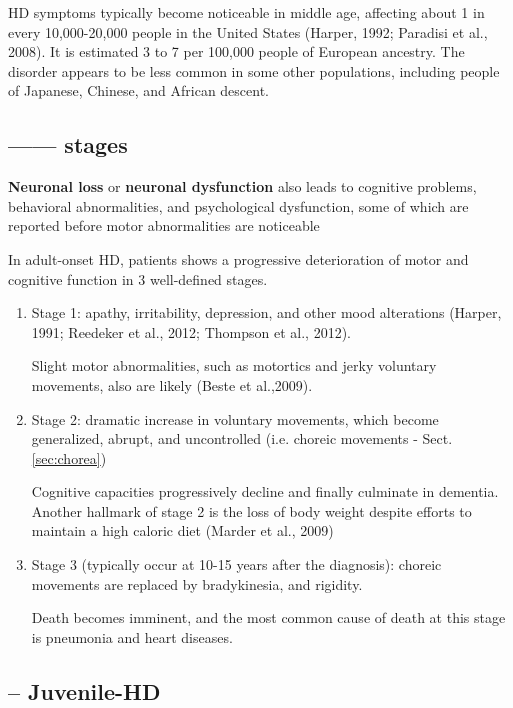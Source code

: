 HD symptoms typically become noticeable in middle age, affecting about 1 in
every 10,000-20,000 people in the United States (Harper, 1992; Paradisi et al.,
2008). It is estimated 3 to 7 per 100,000 people of European ancestry. The
disorder appears to be less common in some other populations, including people
of Japanese, Chinese, and African descent.

\subsection{------ stages}

{\bf Neuronal loss} or {\bf neuronal dysfunction} also leads to cognitive
problems, behavioral abnormalities, and psychological dysfunction, some of which
are reported before motor abnormalities are noticeable

In adult-onset HD, patients shows a progressive deterioration of motor and
cognitive function in 3 well-defined stages.

\begin{enumerate}
  \item Stage 1: apathy, irritability, depression, and other
  mood alterations (Harper, 1991; Reedeker et al., 2012; Thompson et al., 2012).
  
  Slight motor abnormalities, such as motortics and jerky  
  voluntary movements, also are likely (Beste et al.,2009).

  \item Stage 2: dramatic increase in voluntary movements, which become
  generalized, abrupt, and uncontrolled (i.e. choreic movements -
  Sect.\ref{sec:chorea})
  
  Cognitive capacities progressively decline and finally culminate in dementia.
  Another hallmark of stage 2 is the loss of body weight despite efforts to
  maintain a high caloric diet (Marder et al., 2009)
  
  \item Stage 3 (typically occur at 10-15 years after the diagnosis):
  choreic movements are replaced by bradykinesia, and rigidity.
  
  Death becomes imminent, and the most common cause of death at this stage is
  pneumonia and heart diseases.
   
\end{enumerate}

\subsection{-- Juvenile-HD}
\label{sec:HD-Juvenile}

